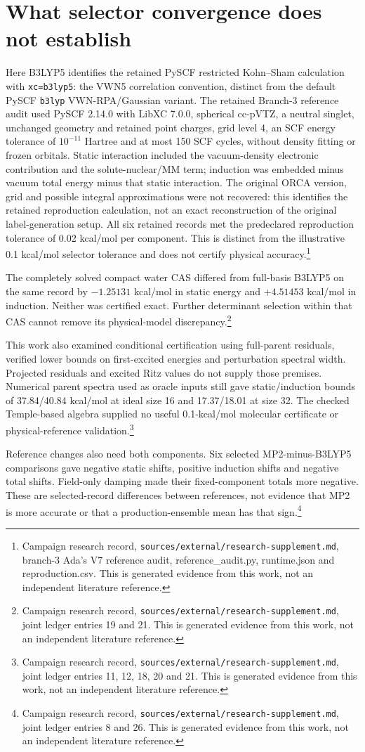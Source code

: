 \documentclass{article}
\newcommand{\record}[1]{\footnote{Campaign research record, \texttt{sources/external/research-supplement.md}, #1. This is generated evidence from this work, not an independent literature reference.}}
\begin{document}
\section{What selector convergence does not establish}
Here B3LYP5 identifies the retained PySCF restricted Kohn--Sham calculation with \texttt{xc=b3lyp5}: the VWN5 correlation convention, distinct from the default PySCF \texttt{b3lyp} VWN-RPA/Gaussian variant. The retained Branch-3 reference audit used PySCF 2.14.0 with LibXC 7.0.0, spherical cc-pVTZ, a neutral singlet, unchanged geometry and retained point charges, grid level 4, an SCF energy tolerance of \(10^{-11}\) Hartree and at most 150 SCF cycles, without density fitting or frozen orbitals. Static interaction included the vacuum-density electronic contribution and the solute-nuclear/MM term; induction was embedded minus vacuum total energy minus that static interaction. The original ORCA version, grid and possible integral approximations were not recovered: this identifies the retained reproduction calculation, not an exact reconstruction of the original label-generation setup. All six retained records met the predeclared reproduction tolerance of 0.02 kcal/mol per component. This is distinct from the illustrative 0.1 kcal/mol selector tolerance and does not certify physical accuracy.\record{branch-3 Ada's V7 reference audit, reference\_audit.py, runtime.json and reproduction.csv}

The completely solved compact water CAS differed from full-basis B3LYP5 on the same record by \(-1.25131\) kcal/mol in static energy and \(+4.51453\) kcal/mol in induction. Neither was certified exact. Further determinant selection within that CAS cannot remove its physical-model discrepancy.\record{joint ledger entries 19 and 21}

This work also examined conditional certification using full-parent residuals, verified lower bounds on first-excited energies and perturbation spectral width. Projected residuals and excited Ritz values do not supply those premises. Numerical parent spectra used as oracle inputs still gave static/induction bounds of 37.84/40.84 kcal/mol at ideal size 16 and 17.37/18.01 at size 32. The checked Temple-based algebra supplied no useful 0.1-kcal/mol molecular certificate or physical-reference validation.\record{joint ledger entries 11, 12, 18, 20 and 21}

Reference changes also need both components. Six selected MP2-minus-B3LYP5 comparisons gave negative static shifts, positive induction shifts and negative total shifts. Field-only damping made their fixed-component totals more negative. These are selected-record differences between references, not evidence that MP2 is more accurate or that a production-ensemble mean has that sign.\record{joint ledger entries 8 and 26}
\end{document}

